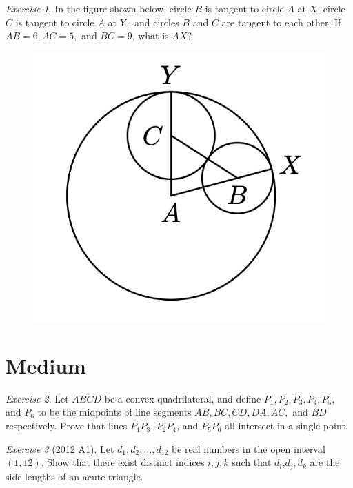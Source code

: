 \documentclass{article}
\theoremstyle{definition}
\theoremstyle{remark}
\newtheorem{exercise}{Exercise}
\begin{document}
\begin{exercise}
In the figure shown below, circle $B$ is tangent to circle $A$ at $X$, circle $C$ is tangent to circle $A$ at $Y$ , and circles $B$ and $C$ are tangent to each other. If $AB = 6, AC = 5,$ and $BC = 9$, what is $AX$?
\begin{figure}[hbt!]
\label{fig:aa}
\small
\centering
\includegraphics[scale = 0.4]{Pics/1.png}
\end{figure}
\end{exercise}

\section{Medium}

\begin{exercise}
Let $ABCD$ be a convex quadrilateral, and define $P_1, P_2, P_3, P_4, P_5,$ and $P_6$ to be the midpoints of line segments $AB, BC, CD, DA, AC,$ and $BD$ respectively. Prove that lines $P_{1}P_{3}$, $P_{2}P_{4}$, and $P_{5}P_{6}$ all intersect in a single point.
\end{exercise}

\begin{exercise}[2012 A1]
Let $d_{1}, d_{2}, \ldots, d_{12}$ be real numbers in the open interval $(1, 12)$. Show that there exist distinct indices $i, j, k$ such that $d_{i}$,$d_{j},d_{k}$ are the side lengths of an acute triangle.
\end{exercise}
\end{document}
